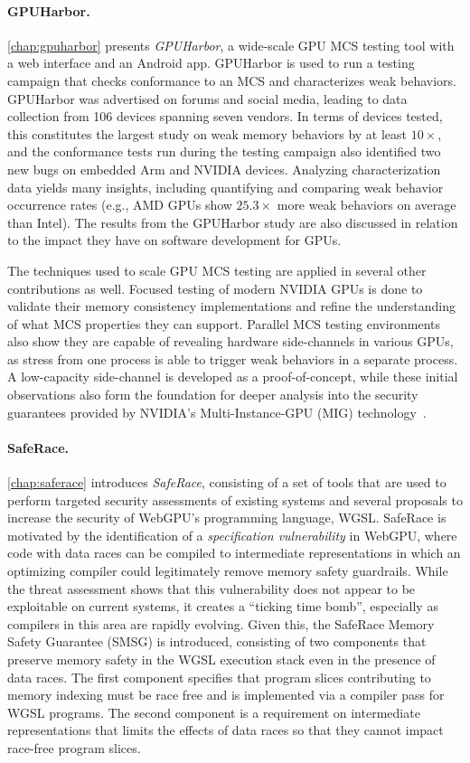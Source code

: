 \paragraph{GPUHarbor.} \mychaplong\ref{chap:gpuharbor} presents \textit{GPUHarbor}, a wide-scale GPU MCS testing tool with a web interface and an Android app. GPUHarbor is used to run a testing campaign that checks conformance to an MCS and characterizes weak behaviors. GPUHarbor was advertised on forums and social media, leading to data collection from 106 devices spanning seven vendors. In terms of devices tested, this constitutes the largest study on weak memory behaviors by at least $10\times$, and the conformance tests run during the testing campaign also identified two new bugs on embedded Arm and NVIDIA devices. Analyzing characterization data yields many insights, including quantifying and comparing weak behavior occurrence rates (e.g., AMD GPUs show $25.3\times$ more weak behaviors on average than Intel).
The results from the GPUHarbor study are also discussed in relation to the impact they have on software development for GPUs.

The techniques used to scale GPU MCS testing are applied in several other contributions as well. Focused testing of modern NVIDIA GPUs is done to validate their memory consistency implementations and refine the understanding of what MCS properties they can support. Parallel MCS testing environments also show they are capable of revealing hardware side-channels in various GPUs, as stress from one process is able to trigger weak behaviors in a separate process. A low-capacity side-channel is developed as a proof-of-concept, while these initial observations also form the foundation for deeper analysis into the security guarantees provided by NVIDIA's Multi-Instance-GPU (MIG) technology~\cite{nvidia2020ampere}.

\paragraph{SafeRace.} \mychaplong\ref{chap:saferace} introduces \textit{SafeRace}, consisting of a set of tools that are used to perform targeted security assessments of existing systems and several proposals to increase the security of WebGPU's programming language, WGSL. SafeRace is motivated by the identification of a \textit{specification vulnerability} in WebGPU, where code with data races can be compiled to intermediate representations in which an optimizing compiler could legitimately remove memory safety guardrails. While the threat assessment shows that this vulnerability does not appear to be exploitable on current systems, it creates a ``ticking time bomb'', especially as compilers in this area are rapidly evolving. Given this, the SafeRace Memory Safety Guarantee (SMSG) is introduced, consisting of two components that preserve memory safety in the WGSL execution stack even in the presence of data races. The first component specifies that program slices contributing to memory indexing must be race free and is implemented via a compiler pass for WGSL programs. The second component is a requirement on intermediate representations that limits the effects of data races so that they cannot impact race-free program slices.

